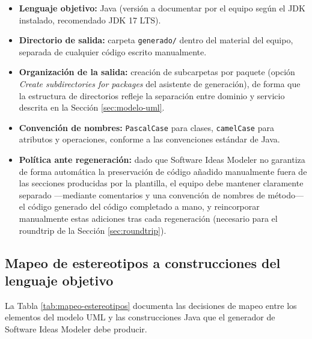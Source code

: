 \documentclass[11pt,a4paper]{article}
\begin{document}
\begin{itemize}[leftmargin=1.4em]
    \item \textbf{Lenguaje objetivo:} Java (versión a documentar por el equipo según el JDK instalado, recomendado JDK 17 LTS).
    \item \textbf{Directorio de salida:} carpeta \texttt{generado/} dentro del material del equipo, separada de cualquier código escrito manualmente.
    \item \textbf{Organización de la salida:} creación de subcarpetas por paquete (opción \emph{Create subdirectories for packages} del asistente de generación), de forma que la estructura de directorios refleje la separación entre dominio y servicio descrita en la Sección \ref{sec:modelo-uml}.
    \item \textbf{Convención de nombres:} \texttt{PascalCase} para clases, \texttt{camelCase} para atributos y operaciones, conforme a las convenciones estándar de Java.
    \item \textbf{Política ante regeneración:} dado que Software Ideas Modeler no garantiza de forma automática la preservación de código añadido manualmente fuera de las secciones producidas por la plantilla, el equipo debe mantener claramente separado —mediante comentarios y una convención de nombres de método— el código generado del código completado a mano, y reincorporar manualmente estas adiciones tras cada regeneración (necesario para el roundtrip de la Sección \ref{sec:roundtrip}).
\end{itemize}

\subsection{Mapeo de estereotipos a construcciones del lenguaje objetivo}

La Tabla \ref{tab:mapeo-estereotipos} documenta las decisiones de mapeo entre los elementos del modelo UML y las construcciones Java que el generador de Software Ideas Modeler debe producir.
\end{document}
